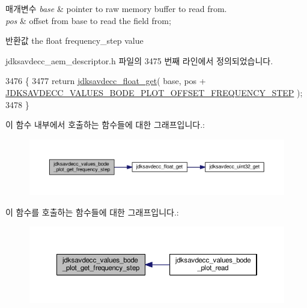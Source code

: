 \begin{DoxyParams}{매개변수}
{\em base} & pointer to raw memory buffer to read from. \\
\hline
{\em pos} & offset from base to read the field from; \\
\hline
\end{DoxyParams}
\begin{DoxyReturn}{반환값}
the float frequency\+\_\+step value 
\end{DoxyReturn}


jdksavdecc\+\_\+aem\+\_\+descriptor.\+h 파일의 3475 번째 라인에서 정의되었습니다.


\begin{DoxyCode}
3476 \{
3477     \textcolor{keywordflow}{return} \hyperlink{group__endian_gadf6108d4d5f2936dd5018e4b80265c8c}{jdksavdecc\_float\_get}( base, pos + 
      \hyperlink{group__values__bode__plot_ga120aa390935ea7320a3f8e72108579d9}{JDKSAVDECC\_VALUES\_BODE\_PLOT\_OFFSET\_FREQUENCY\_STEP} );
3478 \}
\end{DoxyCode}


이 함수 내부에서 호출하는 함수들에 대한 그래프입니다.\+:
\nopagebreak
\begin{figure}[H]
\begin{center}
\leavevmode
\includegraphics[width=350pt]{group__values__bode__plot_ga9c15ecf092f10c2a1c179d73d09ee0e3_cgraph}
\end{center}
\end{figure}




이 함수를 호출하는 함수들에 대한 그래프입니다.\+:
\nopagebreak
\begin{figure}[H]
\begin{center}
\leavevmode
\includegraphics[width=350pt]{group__values__bode__plot_ga9c15ecf092f10c2a1c179d73d09ee0e3_icgraph}
\end{center}
\end{figure}


